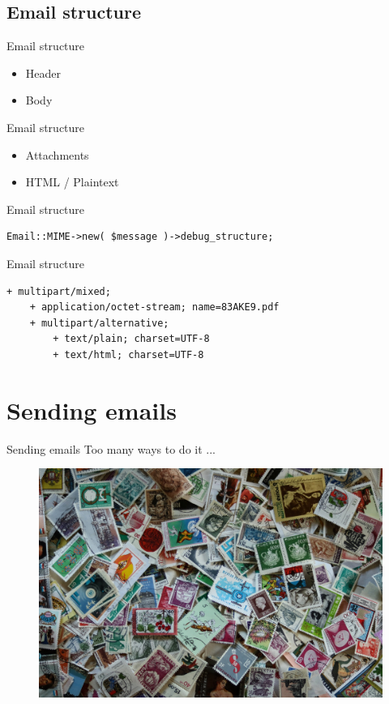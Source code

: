 \subsection{Email structure}

\begin{frame}{Email structure}
  \begin{itemize}
  \item Header
  \item Body
  \end{itemize}
\end{frame}

\begin{frame}{Email structure}
  \begin{itemize}
  \item Attachments
  \item HTML / Plaintext
  \end{itemize}
\end{frame}

\begin{frame}[fragile]{Email structure}
\begin{verbatim}
Email::MIME->new( $message )->debug_structure;
\end{verbatim}
\end{frame}

\begin{frame}[fragile]{Email structure}
\begin{lstlisting}
+ multipart/mixed;
    + application/octet-stream; name=83AKE9.pdf
    + multipart/alternative;
        + text/plain; charset=UTF-8
        + text/html; charset=UTF-8
\end{lstlisting}
\end{frame}

\section{Sending emails}

\begin{frame}{Sending emails}
  Too many ways to do it ...
  \begin{figure}[!ht]
    \centering
    \includegraphics[width=0.9\linewidth]{img/wealth-3262562_1920.jpg}
  \end{figure}
\end{frame}

